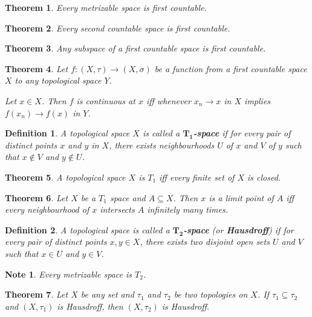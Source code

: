 \documentclass[14pt,twoside]{extreport}
\theoremstyle{dotless}
\newtheorem*{defn}{Definition}
\newtheorem*{thm}{Theorem} %
\newtheorem*{note}{Note} %
\begin{document}
\begin{thm}
    Every metrizable space is first countable.
\end{thm}

\begin{thm}
    Every second countable space is first countable.
\end{thm}

\begin{thm}
    Any subspace of a first countable space is first countable.
\end{thm}

\begin{thm}
    Let $f:(X,\tau) \to (X, \sigma)$ be a function from a first countable space $X$ to any topological space $Y$.

    Let $x \in X$. Then $f$ is continuous at $x$ iff whenever $x_n \to x$ in $X$ implies $f(x_n) \to f(x)$ in $Y$.
\end{thm}

\begin{defn}
    A topological space $X$ is called a \textbf{$\bm{T_1}$-space} if for every pair of distinct points $x$ and $y$ in $X$, there exists neighbourhoods $U$ of $x$ and $V$ of $y$ such that $x \notin V$ and $y \notin U$.
\end{defn}

\begin{thm}
    A topological space $X$ is $T_1$ iff every finite set of $X$ is closed.
\end{thm}

\begin{thm}
    Let $X$ be a $T_1$ space and $A \subseteq X$. Then $x$ is a limit point of $A$ iff every neighbourhood of $x$ intersects $A$ infinitely many times.
\end{thm}

\begin{defn}
    A topological space is called a \textbf{$\bm{T_2}$-space} (or \textbf{Hausdroff}) if for every pair of distinct points $x, y \in X$, there exists two disjoint open sets $U$ and $V$ such that $x \in U$ and $y \in V$.
\end{defn}

\begin{note}
    Every metrizable space is $T_2$.
\end{note}

\begin{thm}
    Let $X$ be any set and $\tau_1$ and $\tau_2$ be two topologies on $X$. If $\tau_1 \subseteq \tau_2$ and $(X,\tau_1)$ is Hausdroff, then $(X,\tau_2)$ is Hausdroff.
\end{thm}
\end{document}
